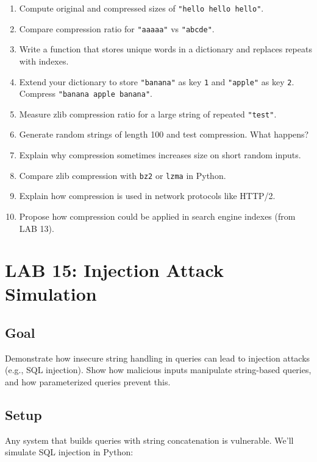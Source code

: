 \documentclass[
  letterpaper,
  DIV=11,
  numbers=noendperiod]{scrreprt}
\providecommand{\tightlist}{%
  \setlength{\itemsep}{0pt}\setlength{\parskip}{0pt}}
\begin{document}
\begin{enumerate}
\def\labelenumi{\arabic{enumi}.}
\tightlist
\item
  Compute original and compressed sizes of
  \texttt{"hello\ hello\ hello"}.
\item
  Compare compression ratio for \texttt{"aaaaa"} vs \texttt{"abcde"}.
\item
  Write a function that stores unique words in a dictionary and replaces
  repeats with indexes.
\item
  Extend your dictionary to store \texttt{"banana"} as key \texttt{1}
  and \texttt{"apple"} as key \texttt{2}. Compress
  \texttt{"banana\ apple\ banana"}.
\item
  Measure zlib compression ratio for a large string of repeated
  \texttt{"test"}.
\item
  Generate random strings of length 100 and test compression. What
  happens?
\item
  Explain why compression sometimes increases size on short random
  inputs.
\item
  Compare zlib compression with \texttt{bz2} or \texttt{lzma} in Python.
\item
  Explain how compression is used in network protocols like HTTP/2.
\item
  Propose how compression could be applied in search engine indexes
  (from LAB 13).
\end{enumerate}

\section{LAB 15: Injection Attack
Simulation}\label{lab-15-injection-attack-simulation}

\subsection{Goal}\label{goal-14}

Demonstrate how insecure string handling in queries can lead to
injection attacks (e.g., SQL injection). Show how malicious inputs
manipulate string-based queries, and how parameterized queries prevent
this.

\subsection{Setup}\label{setup-14}

Any system that builds queries with string concatenation is vulnerable.
We'll simulate SQL injection in Python:
\end{document}
